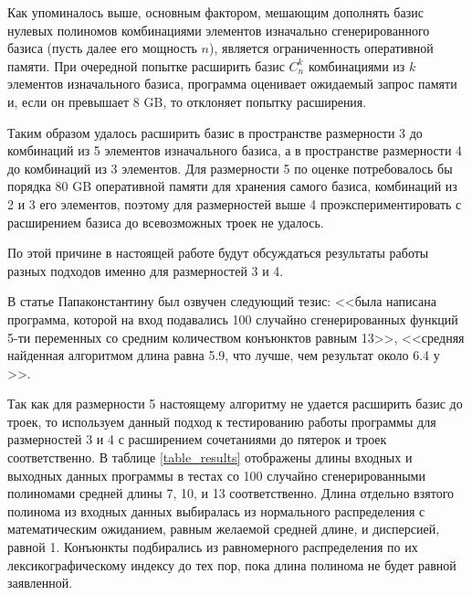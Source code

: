\documentclass[a4paper,12pt,titlepage]{article}
\begin{document}
Как упоминалось выше, основным фактором, мешающим дополнять базис нулевых полиномов комбинациями элементов изначально сгенерированного базиса (пусть далее его мощность $ n $), является ограниченность оперативной памяти. При очередной попытке расширить базис $ C_n^k $ комбинациями из $ k $ элементов изначального базиса, программа оценивает ожидаемый запрос памяти и, если он превышает 8 GB, то отклоняет попытку расширения.

Таким образом удалось расширить базис в пространстве размерности 3 до комбинаций из 5 элементов изначального базиса, а в пространстве размерности 4 до комбинаций из 3 элементов. Для размерности 5 по оценке потребовалось бы порядка 80 GB оперативной памяти для хранения самого базиса, комбинаций из 2 и 3 его элементов, поэтому для размерностей выше 4 проэкспериментировать с расширением базиса до всевозможных троек не удалось.

По этой причине в настоящей работе будут обсуждаться результаты работы разных подходов именно для размерностей 3 и 4.

В статье Папаконстантину \cite{513100} был озвучен следующий тезис: <<была написана программа, которой на вход подавались 100 случайно сгенерированных функций 5-ти переменных со средним количеством конъюнктов равным 13>>, <<средняя найденная алгоритмом длина равна 5.9, что лучше, чем результат около 6.4 у \cite{beat1, beat2}>>.

Так как для размерности 5 настоящему алгоритму не удается расширить базис до троек, то используем данный подход к тестированию работы программы для размерностей 3 и 4 с расширением сочетаниями до пятерок и троек соответственно. В таблице \ref{table_results} отображены длины входных и выходных данных программы в тестах со 100 случайно сгенерированными полиномами средней длины 7, 10, и 13 соответственно. Длина отдельно взятого полинома из входных данных выбиралась из нормального распределения с математическим ожиданием, равным желаемой средней длине, и дисперсией, равной 1. Конъюнкты подбирались из равномерного распределения по их лексикографическому индексу до тех пор, пока длина полинома не будет равной заявленной.
\end{document}
